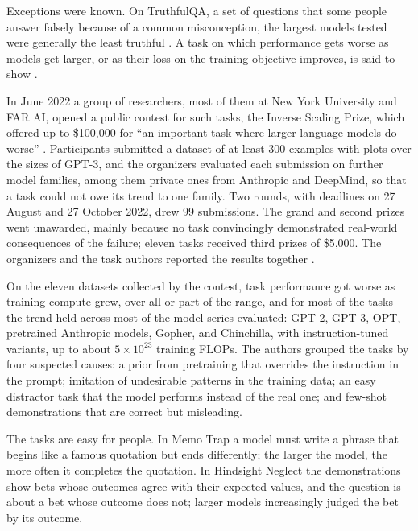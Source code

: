\begin{refsection}
Exceptions were known. On TruthfulQA, a set of questions that some people answer falsely because of a common misconception, the largest models tested were generally the least truthful \parencite{LinHiltonEvans2022}. A task on which performance gets worse as models get larger, or as their loss on the training objective improves, is said to show .

In June 2022 a group of researchers, most of them at New York University and FAR AI, opened a public contest for such tasks, the Inverse Scaling Prize, which offered up to \$100,000 for ``an important task where larger language models do worse'' \parencite{McKenzieEtAl2022}. Participants submitted a dataset of at least 300 examples with plots over the sizes of GPT-3, and the organizers evaluated each submission on further model families, among them private ones from Anthropic and DeepMind, so that a task could not owe its trend to one family. Two rounds, with deadlines on 27 August and 27 October 2022, drew 99 submissions. The grand and second prizes went unawarded, mainly because no task convincingly demonstrated real-world consequences of the failure; eleven tasks received third prizes of \$5,000. The organizers and the task authors reported the results together \parencite{McKenzieEtAl2023}.

\begin{finding}\label{fd:extrapolation:prize}
On the eleven datasets collected by the contest, task performance got worse as training compute grew, over all or part of the range, and for most of the tasks the trend held across most of the model series evaluated: GPT-2, GPT-3, OPT, pretrained Anthropic models, Gopher, and Chinchilla, with instruction-tuned variants, up to about $5\times10^{23}$ training FLOPs. The authors grouped the tasks by four suspected causes: a prior from pretraining that overrides the instruction in the prompt; imitation of undesirable patterns in the training data; an easy distractor task that the model performs instead of the real one; and few-shot demonstrations that are correct but misleading.
\end{finding}

The tasks are easy for people. In Memo Trap a model must write a phrase that begins like a famous quotation but ends differently; the larger the model, the more often it completes the quotation. In Hindsight Neglect the demonstrations show bets whose outcomes agree with their expected values, and the question is about a bet whose outcome does not; larger models increasingly judged the bet by its outcome.


\end{refsection}
